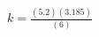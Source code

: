 \documentclass[preview]{standalone}
\begin{document}
\begin{center}
$k = \frac{(5.2) (3.185)}{(6)}$
\end{center}
\end{document}
